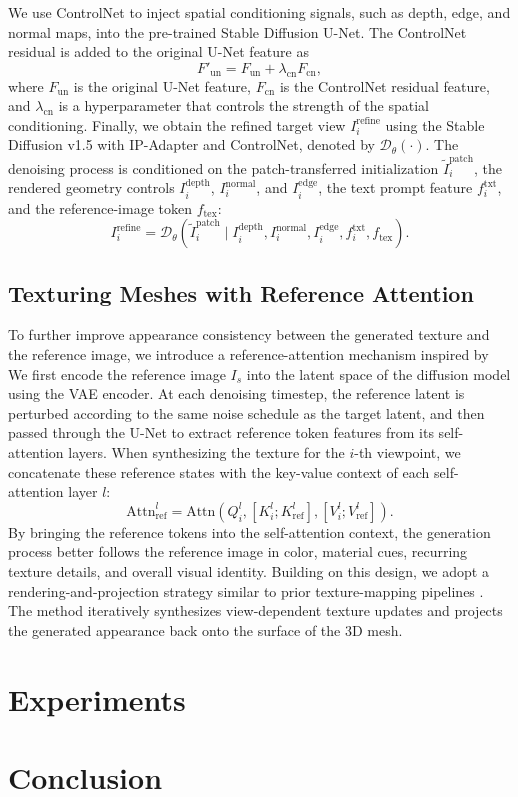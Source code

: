 \documentclass{article}
\begin{document}
We use ControlNet \cite{Zhang_2023_ICCV} to inject spatial conditioning signals, such as depth, edge, and normal maps, into the pre-trained Stable Diffusion U-Net. The ControlNet residual is added to the original U-Net feature as
\begin{equation}
F'_{\mathrm{un}} = F_{\mathrm{un}} + \lambda_{\mathrm{cn}} F_{\mathrm{cn}},
\end{equation}
where $F_{\mathrm{un}}$ is the original U-Net feature, $F_{\mathrm{cn}}$ is the ControlNet residual feature, and $\lambda_{\mathrm{cn}}$ is a hyperparameter that controls the strength of the spatial conditioning.
Finally, we obtain the refined target view $I_i^{\mathrm{refine}}$ using the Stable Diffusion v1.5 with IP-Adapter and ControlNet, denoted by $\mathcal{D}_{\theta}(\cdot)$. The denoising process is conditioned on the patch-transferred initialization $\tilde{I}^{\mathrm{patch}}_i$, the rendered geometry controls $I_i^{\mathrm{depth}}$, $I_i^{\mathrm{normal}}$, and $I_i^{\mathrm{edge}}$, the text prompt feature $f_i^{\mathrm{txt}}$, and the reference-image token $f_{\mathrm{tex}}$:
\begin{equation}
I_i^{\mathrm{refine}}
=
\mathcal{D}_{\theta}\left(
\tilde{I}^{\mathrm{patch}}_i
\mid
I_i^{\mathrm{depth}},
I_i^{\mathrm{normal}},
I_i^{\mathrm{edge}},
f_i^{\mathrm{txt}},
f_{\mathrm{tex}}
\right).
\end{equation}
\subsection{Texturing Meshes with Reference Attention}
To further improve appearance consistency between the generated texture and the reference image, we introduce a reference-attention mechanism inspired by\cite{zhang2023referenceonly,chen2025meshgen} We first encode the reference image $I_s$ into the latent space of the diffusion model using the VAE encoder. At each denoising timestep, the reference latent is perturbed according to the same noise schedule as the target latent, and then passed through the U-Net to extract reference token features from its self-attention layers. When synthesizing the texture for the $i$-th viewpoint, we concatenate these reference states with the key-value context of each self-attention layer $l$:
\begin{equation}
\mathrm{Attn}_{\mathrm{ref}}^l
=
\mathrm{Attn}
\left(
Q_i^l,
\left[K_i^l; K_{\mathrm{ref}}^l\right],
\left[V_i^l; V_{\mathrm{ref}}^l\right]
\right).
\end{equation}
By bringing the reference tokens into the self-attention context, the generation process better follows the reference image in color, material cues, recurring texture details, and overall visual identity. Building on this design, we adopt a rendering-and-projection strategy similar to prior texture-mapping pipelines \cite{chen2022auv,perla2024easi}. The method iteratively synthesizes view-dependent texture updates and projects the generated appearance back onto the surface of the 3D mesh.

\section{Experiments}

\section{Conclusion}



\end{document}
